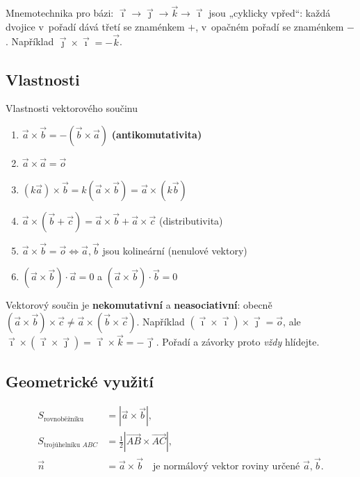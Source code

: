 \documentclass[a4paper,11pt]{article}
\newcommand{\abs}[1]{\left\lvert #1\right\rvert}
\newcommand{\ii}{\vec{\imath}}
\newcommand{\jj}{\vec{\jmath}}
\newcommand{\kk}{\vec{k}}
\begin{document}
\begin{poznamka}
Mnemotechnika pro bázi: $\ii\to\jj\to\kk\to\ii$ jsou „cyklicky vpřed“: každá
dvojice v~pořadí dává třetí se znaménkem $+$, v~opačném pořadí se znaménkem $-$.
Například $\jj\times\ii=-\kk$.
\end{poznamka}

\subsection{Vlastnosti}

\begin{veta}{Vlastnosti vektorového součinu}
\begin{enumerate}[label=(\roman*),nosep]
  \item $\vec a\times\vec b=-(\vec b\times\vec a)$ \hfill \textbf{(antikomutativita)}
  \item $\vec a\times\vec a=\vec o$
  \item $(k\vec a)\times\vec b=k(\vec a\times\vec b)=\vec a\times(k\vec b)$
  \item $\vec a\times(\vec b+\vec c)=\vec a\times\vec b+\vec a\times\vec c$ \hfill (distributivita)
  \item $\vec a\times\vec b=\vec o\iff\vec a,\vec b$ jsou kolineární (nenulové vektory)
  \item $(\vec a\times\vec b)\cdot\vec a=0$ a $(\vec a\times\vec b)\cdot\vec b=0$
\end{enumerate}
\end{veta}

\begin{pozor}
Vektorový součin je \textbf{nekomutativní} a \textbf{neasociativní}:
obecně $(\vec a\times\vec b)\times\vec c\neq\vec a\times(\vec b\times\vec c)$.
Například $(\ii\times\ii)\times\jj=\vec o$, ale $\ii\times(\ii\times\jj)=\ii\times\kk=-\jj$.
Pořadí a závorky proto \emph{vždy} hlídejte.
\end{pozor}

\subsection{Geometrické využití}

\begin{align}
  S_{\text{rovnoběžníku}}&=\abs{\vec a\times\vec b},\\
  S_{\text{trojúhelníku }ABC}&=\tfrac12\abs{\overrightarrow{AB}\times\overrightarrow{AC}},\\
  \vec n&=\vec a\times\vec b\quad\text{je normálový vektor roviny určené }\vec a,\vec b.
\end{align}
\end{document}
